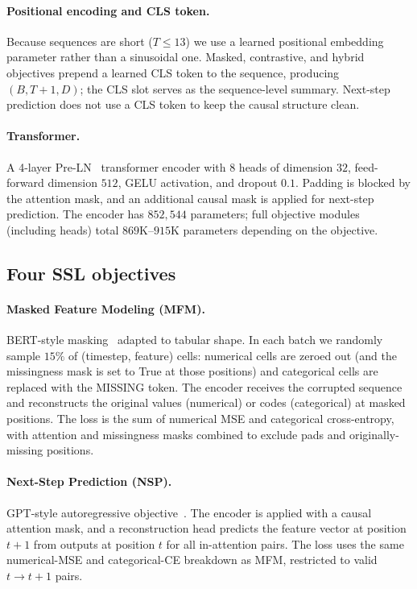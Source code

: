 \documentclass[sigconf, anonymous, review]{acmart}
\begin{document}
\paragraph{Positional encoding and CLS token.}
Because sequences are short ($T \leq 13$) we use a learned positional
embedding parameter rather than a sinusoidal one. Masked,
contrastive, and hybrid objectives prepend a learned CLS token to
the sequence, producing $(B, T+1, D)$; the CLS slot serves as the
sequence-level summary. Next-step prediction does not use a CLS
token to keep the causal structure clean.

\paragraph{Transformer.}
A 4-layer Pre-LN~\cite{Xiong2020} transformer encoder with $8$ heads
of dimension $32$, feed-forward dimension $512$, GELU activation, and
dropout $0.1$. Padding is blocked by the attention mask, and an
additional causal mask is applied for next-step prediction. The
encoder has $852{,}544$ parameters; full objective modules (including
heads) total $869$K--$915$K parameters depending on the objective.

\subsection{Four SSL objectives}
\label{sec:obj}

\paragraph{Masked Feature Modeling (MFM).}
BERT-style masking~\cite{Devlin2018} adapted to tabular shape. In each
batch we randomly sample $15\%$ of (timestep, feature) cells: numerical
cells are zeroed out (and the missingness mask is set to True at those
positions) and categorical cells are replaced with the MISSING token.
The encoder receives the corrupted sequence and reconstructs the
original values (numerical) or codes (categorical) at masked
positions. The loss is the sum of numerical MSE and categorical
cross-entropy, with attention and missingness masks combined to
exclude pads and originally-missing positions.

\paragraph{Next-Step Prediction (NSP).}
GPT-style autoregressive objective~\cite{Radford2018}. The encoder is
applied with a causal attention mask, and a reconstruction head
predicts the feature vector at position $t+1$ from outputs at
position $t$ for all in-attention pairs. The loss uses the same
numerical-MSE and categorical-CE breakdown as MFM, restricted to
valid $t \to t+1$ pairs.
\end{document}
